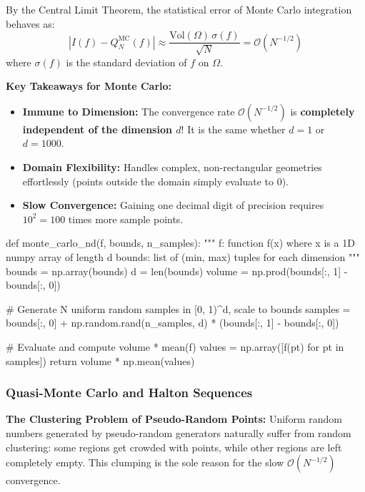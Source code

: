 \begin{remark}
    By the Central Limit Theorem, the statistical error of Monte Carlo integration behaves as:
    $$|I(f) - Q_N^{\text{MC}}(f)| \approx \frac{\text{Vol}(\Omega) \, \sigma(f)}{\sqrt{N}} = \mathcal{O}\left(N^{-1/2}\right)$$
    where $\sigma(f)$ is the standard deviation of $f$ on $\Omega$.
\end{remark}

\begin{remark}
    \textbf{Key Takeaways for Monte Carlo:}
    \begin{itemize}
        \item \textbf{Immune to Dimension:} The convergence rate $\mathcal{O}(N^{-1/2})$ is \textbf{completely independent of the dimension $d$}! It is the same whether $d = 1$ or $d = 1000$.
        \item \textbf{Domain Flexibility:} Handles complex, non-rectangular geometries effortlessly (points outside the domain simply evaluate to 0).
        \item \textbf{Slow Convergence:} Gaining one decimal digit of precision requires $10^2 = 100$ times more sample points.
    \end{itemize}
\end{remark}

\begin{codeexample}
def monte_carlo_nd(f, bounds, n_samples):
    """
    f: function f(x) where x is a 1D numpy array of length d
    bounds: list of (min, max) tuples for each dimension
    """
    bounds = np.array(bounds)
    d = len(bounds)
    volume = np.prod(bounds[:, 1] - bounds[:, 0])
    
    # Generate N uniform random samples in [0, 1)^d, scale to bounds
    samples = bounds[:, 0] + np.random.rand(n_samples, d) * (bounds[:, 1] - bounds[:, 0])
    
    # Evaluate and compute volume * mean(f)
    values = np.array([f(pt) for pt in samples])
    return volume * np.mean(values)
\end{codeexample}

\subsubsection{Quasi-Monte Carlo and Halton Sequences}

\begin{remark}
    \textbf{The Clustering Problem of Pseudo-Random Points:} Uniform random numbers generated by pseudo-random generators naturally suffer from random clustering: some regions get crowded with points, while other regions are left completely empty. This clumping is the sole reason for the slow $\mathcal{O}(N^{-1/2})$ convergence.
\end{remark}

